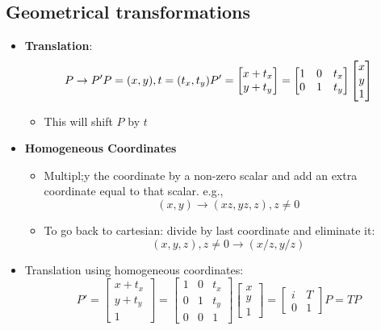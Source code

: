 \subsection{Geometrical transformations}
\begin{itemize}
	\item \textbf{Translation}:
	$$P\to P'\\
	P=(x,y), t=(t_x, t_y)\\
	P'=\begin{bmatrix}
		x + t_x\\
		y + t_y
	\end{bmatrix}=\begin{bmatrix}
		1 & 0 & t_x \\
		0 & 1 & t_y
	\end{bmatrix}\begin{bmatrix}
		x \\ y \\ 1	
	\end{bmatrix}$$
	\begin{itemize}
		\item This will shift $P$ by $t$
	\end{itemize}
	\item \textbf{Homogeneous Coordinates}
	\begin{itemize}
		\item Multipl;y the coordinate by a non-zero scalar and add an extra coordinate equal to that scalar. e.g.,
		$$(x,y)\to (xz, yz, z), z\neq 0$$
		\item To go back to cartesian: divide by last coordinate and eliminate it:
		$$(x,y,z), z\neq 0\to (x/z, y/z)$$
	\end{itemize}
	\item Translation using homogeneous coordinates:
	$$P'=\begin{bmatrix}
		x+t_x\\y+t_y\\1
	\end{bmatrix}=\begin{bmatrix}
		1 & 0 & t_x \\
		0 & 1 & t_y \\
		0 & 0 & 1
	\end{bmatrix}\begin{bmatrix}
		x \\ y\\ 1
	\end{bmatrix}=\begin{bmatrix}
		i & T \\ 0 & 1
	\end{bmatrix}P=TP$$

\end{itemize}
